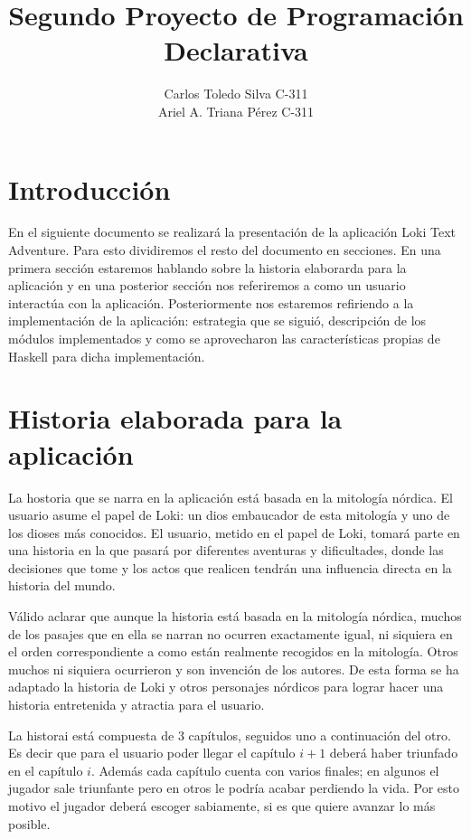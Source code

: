 \documentclass[12pt]{article}
\begin{document}
	\title{Segundo Proyecto de Programaci\'on Declarativa}
	\author{Carlos Toledo Silva C-311\\
		    Ariel A. Triana P\'erez C-311}
	\date{}
	\maketitle
	
\section{Introducci\'on}

En el siguiente documento se realizar\'a la presentaci\'on de la aplicaci\'on Loki Text Adventure. Para esto dividiremos el resto del documento en secciones. En una primera secci\'on estaremos hablando sobre la historia elaborarda para la aplicaci\'on y en una posterior secci\'on nos referiremos a como un usuario interact\'ua con la aplicaci\'on. Posteriormente nos estaremos refiriendo a la implementaci\'on de la aplicaci\'on: estrategia que se sigui\'o, descripci\'on de los m\'odulos implementados y como se aprovecharon las caracter\'isticas propias de Haskell para dicha implementaci\'on.

\section{Historia elaborada para la aplicaci\'on}

La hostoria que se narra en la aplicaci\'on est\'a basada en la mitolog\'ia n\'ordica. El usuario asume el papel de Loki: un dios embaucador de esta mitolog\'ia y uno de los dioses m\'as conocidos. El usuario, metido en el papel de Loki, tomar\'a parte en una historia en la que pasar\'a por diferentes aventuras y dificultades, donde las decisiones que tome y los actos que realicen tendr\'an una influencia directa en la historia del mundo.

V\'alido aclarar que aunque la historia est\'a basada en la mitolog\'ia n\'ordica, muchos de los pasajes que en ella se narran no ocurren exactamente igual, ni siquiera en el orden correspondiente a como est\'an realmente recogidos en la mitolog\'ia. Otros muchos ni siquiera ocurrieron y son invenci\'on de los autores. De esta forma se ha adaptado la historia de Loki y otros personajes n\'ordicos para lograr hacer una historia entretenida y atractia para el usuario.

La historai est\'a compuesta de 3 cap\'itulos, seguidos uno a continuaci\'on del otro. Es decir que para el usuario poder llegar el cap\'itulo $i+1$ deber\'a haber triunfado en el cap\'itulo $i$. Adem\'as cada cap\'itulo cuenta con varios finales; en algunos el jugador sale triunfante pero en otros le podr\'ia acabar perdiendo la vida. Por esto motivo el jugador deber\'a escoger sabiamente, si es que quiere avanzar lo m\'as posible.  
\end{document}
